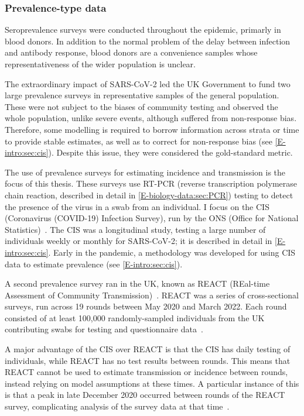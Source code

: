 \documentclass[thesis.tex]{subfiles}
\begin{document}
\subsubsection{Prevalence-type data}

Seroprevalence surveys were conducted throughout the epidemic, primarly in blood donors.
In addition to the normal problem of the delay between infection and antibody response, blood donors are a  convenience samples whose representativeness of the wider population is unclear.

The extraordinary impact of SARS-CoV-2 led the UK Government to fund two large prevalence surveys in representative samples of the general population.
These were not subject to the biases of community testing and observed the whole population, unlike severe events, although suffered from non-response bias.
Therefore, some modelling is required to borrow information across strata or time to provide stable estimates, as well as to correct for non-response bias (see \cref{E-intro:sec:cis}).
Despite this issue, they were considered the gold-standard metric.

The use of prevalence surveys for estimating incidence and transmission is the focus of this thesis.
These surveys use RT-PCR (reverse transcription polymerase chain reaction, described in detail in \cref{E-biology-data:sec:PCR}) testing to detect the presence of the virus in a swab from an individual.
I focus on the CIS (Coronavirus (COVID-19) Infection Survey), run by the ONS (Office for National Statistics)~\autocite{CIS,cisMethodsONS}.
The CIS was a longitudinal study, testing a large number of individuals weekly or monthly for SARS-CoV-2; it is described in detail in \cref{E-intro:sec:cis}.
Early in the pandemic, a methodology was developed for using CIS data to estimate prevalence (see \cref{E-intro:sec:cis}).

A second prevalence survey ran in the UK, known as REACT (REal-time Assessment of Community Transmission)~\autocite{rileyResurgence,rileyREACT}.
REACT was a series of cross-sectional surveys, run across 19 rounds between May 2020 and March 2022.
Each round consisted of at least 100,000 randomly-sampled individuals from the UK contributing swabs for testing and questionnaire data~\autocite{elliottTwin}.

A major advantage of the CIS over REACT is that the CIS has daily testing of individuals, while REACT has no test results between rounds.
This means that REACT cannot be used to estimate transmission or incidence between rounds, instead relying on model assumptions at these times.
A particular instance of this is that a peak in late December 2020 occurred between rounds of the REACT survey, complicating analysis of the survey data at that time~\autocite{rileyREACTround8}.
\end{document}
